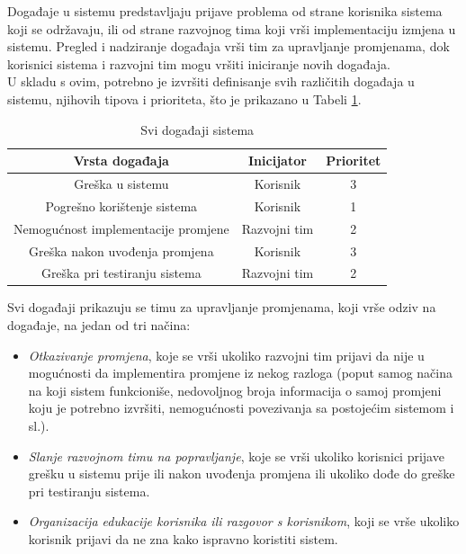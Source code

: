 \documentclass[12pt,a4paper]{article}
\begin{document}
\quad Događaje u sistemu predstavljaju prijave problema od strane korisnika sistema koji se održavaju, ili od strane razvojnog tima koji vrši implementaciju izmjena u sistemu. Pregled i nadziranje događaja vrši tim za upravljanje promjenama, dok korisnici sistema i razvojni tim mogu vršiti iniciranje novih događaja. \\

U skladu s ovim, potrebno je izvršiti definisanje svih različitih događaja u sistemu, njihovih tipova i prioriteta, što je prikazano u Tabeli \ref{tabela1}.

\begin{table}[H]
\centering
\begin{tabular}{| c | c | c |} \hline
\cellcolor{gray!25}\textbf{Vrsta događaja}		& \cellcolor{gray!25}\textbf{Inicijator}			& \cellcolor{gray!25}\textbf{Prioritet} 		\\ \hline
Greška u sistemu										& \cellcolor{green!25}Korisnik						& \cellcolor{blue!15}3							\\ \hline
Pogrešno korištenje sistema							& \cellcolor{green!25}Korisnik						& \cellcolor{blue!15}1							\\ \hline
Nemogućnost implementacije promjene			& \cellcolor{green!25}Razvojni tim					& \cellcolor{blue!15}2							\\ \hline
Greška nakon uvođenja promjena					& \cellcolor{yellow!25}Korisnik						& \cellcolor{blue!35}3							\\ \hline
Greška pri testiranju sistema							& \cellcolor{red!25}Razvojni tim					& \cellcolor{blue!55}2							\\ \hline
\end{tabular}
\caption{Svi događaji sistema}
\label{tabela1}
\end{table}

Svi događaji prikazuju se timu za upravljanje promjenama, koji vrše odziv na događaje, na jedan od tri načina:

\begin{itemize}
\renewcommand\labelitemi{-}
\item \textit{Otkazivanje promjena}, koje se vrši ukoliko razvojni tim prijavi da nije u mogućnosti da implementira promjene iz nekog razloga (poput samog načina na koji sistem funkcioniše, nedovoljnog broja informacija o samoj promjeni koju je potrebno izvršiti, nemogućnosti povezivanja sa postojećim sistemom i sl.).
\item \textit{Slanje razvojnom timu na popravljanje}, koje se vrši ukoliko korisnici prijave grešku u sistemu prije ili nakon uvođenja promjena ili ukoliko dođe do greške pri testiranju sistema.
\item \textit{Organizacija edukacije korisnika ili razgovor s korisnikom}, koji se vrše ukoliko korisnik prijavi da ne zna kako ispravno koristiti sistem.
\end{itemize}
\end{document}
